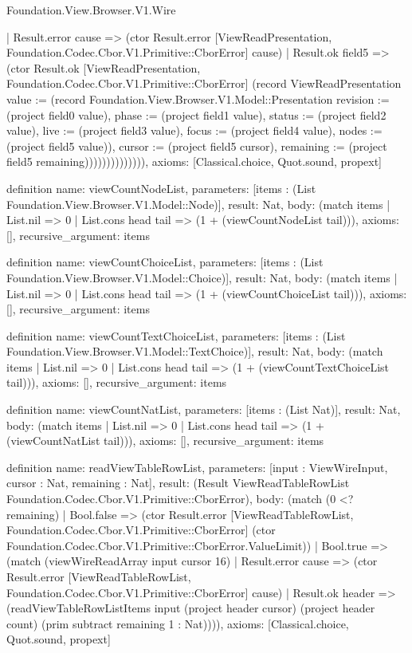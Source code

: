 \begin{lexlean}{Foundation.View.Browser.V1.Wire}
\begin{semanticmodule}
{                        | Result.error cause => (ctor Result.error [ViewReadPresentation, Foundation.Codec.Cbor.V1.Primitive::CborError] cause)
                        | Result.ok field5 => (ctor Result.ok [ViewReadPresentation, Foundation.Codec.Cbor.V1.Primitive::CborError] (record ViewReadPresentation {value := (record Foundation.View.Browser.V1.Model::Presentation {revision := (project field0 value), phase := (project field1 value), status := (project field2 value), live := (project field3 value), focus := (project field4 value), nodes := (project field5 value)}), cursor := (project field5 cursor), remaining := (project field5 remaining)}))))))))))))),
  axioms: [Classical.choice, Quot.sound, propext]
}

definition{
  name: viewCountNodeList,
  parameters: [items : (List Foundation.View.Browser.V1.Model::Node)],
  result: Nat,
  body: (match items | List.nil => 0 | List.cons head tail => (1 + (viewCountNodeList tail))),
  axioms: [],
  recursive_argument: items
}

definition{
  name: viewCountChoiceList,
  parameters: [items : (List Foundation.View.Browser.V1.Model::Choice)],
  result: Nat,
  body: (match items | List.nil => 0 | List.cons head tail => (1 + (viewCountChoiceList tail))),
  axioms: [],
  recursive_argument: items
}

definition{
  name: viewCountTextChoiceList,
  parameters: [items : (List Foundation.View.Browser.V1.Model::TextChoice)],
  result: Nat,
  body: (match items | List.nil => 0 | List.cons head tail => (1 + (viewCountTextChoiceList tail))),
  axioms: [],
  recursive_argument: items
}

definition{
  name: viewCountNatList,
  parameters: [items : (List Nat)],
  result: Nat,
  body: (match items | List.nil => 0 | List.cons head tail => (1 + (viewCountNatList tail))),
  axioms: [],
  recursive_argument: items
}

definition{
  name: readViewTableRowList,
  parameters: [input : ViewWireInput, cursor : Nat, remaining : Nat],
  result: (Result ViewReadTableRowList Foundation.Codec.Cbor.V1.Primitive::CborError),
  body: (match (0 <? remaining)
    | Bool.false => (ctor Result.error [ViewReadTableRowList, Foundation.Codec.Cbor.V1.Primitive::CborError] (ctor Foundation.Codec.Cbor.V1.Primitive::CborError.ValueLimit))
    | Bool.true => (match (viewWireReadArray input cursor 16)
      | Result.error cause => (ctor Result.error [ViewReadTableRowList, Foundation.Codec.Cbor.V1.Primitive::CborError] cause)
      | Result.ok header => (readViewTableRowListItems input (project header cursor) (project header count) (prim subtract remaining 1 : Nat)))),
  axioms: [Classical.choice, Quot.sound, propext]
}


\end{semanticmodule}
\end{lexlean}
